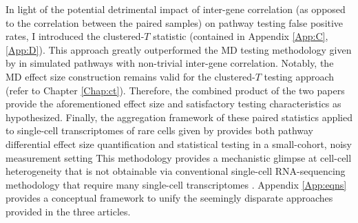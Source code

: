 In light of the potential detrimental impact \citep{Tamayo2016} of inter-gene correlation (as opposed to the correlation between the paired samples) on pathway testing false positive rates, I introduced the clustered-$T$ statistic (contained in Appendix \ref{App:C}, \ref{App:D}). This approach greatly outperformed the MD testing methodology given by \citet{Schissler2015} in simulated pathways with non-trivial inter-gene correlation. Notably, the MD effect size construction remains valid for the clustered-$T$ testing approach (refer to Chapter \ref{Chap:ct}). Therefore, the combined product of the two papers provide the aforementioned effect size and satisfactory testing characteristics as hypothesized. Finally, the aggregation framework of these paired statistics applied to single-cell transcriptomes of rare cells given by \citet{Schissler2016} provides both pathway differential effect size quantification and statistical testing in a small-cohort, noisy measurement setting This methodology provides a mechanistic glimpse at cell-cell heterogeneity that is not obtainable via conventional single-cell RNA-sequencing methodology that require many single-cell transcriptomes \citep{Ding2015, Grun2014}. Appendix \ref{App:eqns} provides a conceptual framework to unify the seemingly disparate approaches provided in the three articles.


